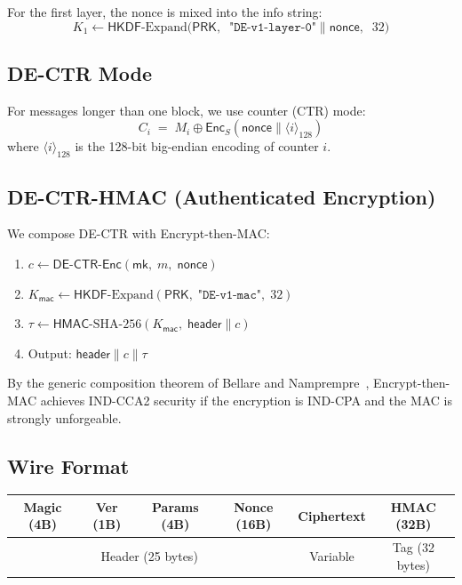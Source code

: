 \documentclass[11pt]{article}
\newcommand{\Enc}{\textsf{Enc}}
\newcommand{\HKDF}{\textsf{HKDF}}
\newcommand{\HMAC}{\textsf{HMAC}}
\begin{document}
For the first layer, the nonce is mixed into the info string:
\[
K_1 \leftarrow \HKDF\text{-Expand}\bigl(\textsf{PRK},\;\; \texttt{"DE-v1-layer-0"} \| \textsf{nonce},\;\; 32\bigr)
\]

\subsection{DE-CTR Mode}

For messages longer than one block, we use counter (CTR) mode:
\[
C_i \;=\; M_i \oplus \Enc_S(\textsf{nonce} \| \langle i \rangle_{128})
\]
where $\langle i \rangle_{128}$ is the 128-bit big-endian encoding of counter $i$.

\subsection{DE-CTR-HMAC (Authenticated Encryption)}

We compose DE-CTR with Encrypt-then-MAC:
\begin{enumerate}[leftmargin=*]
\item $c \leftarrow \textsf{DE-CTR-Enc}(\textsf{mk},\; m,\; \textsf{nonce})$
\item $K_{\textsf{mac}} \leftarrow \HKDF\text{-Expand}(\textsf{PRK},\; \texttt{"DE-v1-mac"},\; 32)$
\item $\tau \leftarrow \HMAC\text{-SHA-256}(K_{\textsf{mac}},\; \textsf{header} \| c)$
\item Output: $\textsf{header} \| c \| \tau$
\end{enumerate}

By the generic composition theorem of Bellare and
Namprempre~\cite{bellare2000}, Encrypt-then-MAC achieves IND-CCA2 security
if the encryption is IND-CPA and the MAC is strongly unforgeable.

\subsection{Wire Format}

\begin{center}
\begin{tabular}{|c|c|c|c|c|c|}
\hline
Magic (4B) & Ver (1B) & Params (4B) & Nonce (16B) & Ciphertext & HMAC (32B) \\
\hline
\multicolumn{4}{|c|}{Header (25 bytes)} & Variable & Tag (32 bytes) \\
\hline
\end{tabular}
\end{center}
\end{document}
